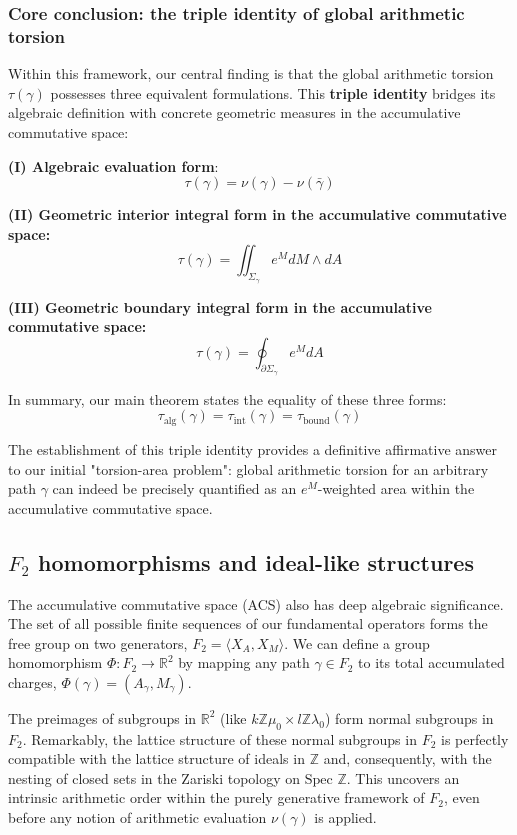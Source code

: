 \documentclass[12pt]{article}
\begin{document}
\subsubsection*{Core conclusion: the triple identity of global arithmetic torsion}

Within this framework, our central finding is that the global arithmetic torsion $\tau(\gamma)$ possesses three equivalent formulations. This \textbf{triple identity} bridges its algebraic definition with concrete geometric measures in the accumulative commutative space:

\textbf{(I) Algebraic evaluation form}:
\[ \tau(\gamma) = \nu(\gamma) - \nu(\bar{\gamma}) \]

\textbf{(II) Geometric interior integral form in the accumulative commutative space:}
\[ \tau(\gamma) = \iint_{\Sigma_\gamma} e^M dM \wedge dA \]

\textbf{(III) Geometric boundary integral form in the accumulative commutative space:}
\[ \tau(\gamma) = \oint_{\partial \Sigma_\gamma} e^M dA \]

In summary, our main theorem states the equality of these three forms:
\begin{equation}
\tau_{\text{alg}}(\gamma) = \tau_{\text{int}}(\gamma) = \tau_{\text{bound}}(\gamma)
\label{eq:triple_identity_final_narrative_enhanced_acs_AM_lc}
\end{equation}

The establishment of this triple identity provides a definitive affirmative answer to our initial "torsion-area problem": global arithmetic torsion for an arbitrary path $\gamma$ can indeed be precisely quantified as an $e^M$-weighted area within the accumulative commutative space.

\subsection{$F_2$ homomorphisms and ideal-like structures}
\label{sec:acs_algebraic_significance_revised_AM_lc}

The accumulative commutative space (ACS) also has deep algebraic significance. The set of all possible finite sequences of our fundamental operators forms the free group on two generators, $F_2 = \langle X_A, X_M \rangle$. We can define a group homomorphism $\Phi: F_2 \to \mathbb{R}^2$ by mapping any path $\gamma \in F_2$ to its total accumulated charges, $\Phi(\gamma) = (A_\gamma, M_\gamma)$.

The preimages of subgroups in $\mathbb{R}^2$ (like $k\mathbb{Z}\mu_0 \times l\mathbb{Z}\lambda_0$) form normal subgroups in $F_2$. Remarkably, the lattice structure of these normal subgroups in $F_2$ is perfectly compatible with the lattice structure of ideals in $\mathbb{Z}$ and, consequently, with the nesting of closed sets in the Zariski topology on $\text{Spec } \mathbb{Z}$. This uncovers an intrinsic arithmetic order within the purely generative framework of $F_2$, even before any notion of arithmetic evaluation $\nu(\gamma)$ is applied.
\end{document}
